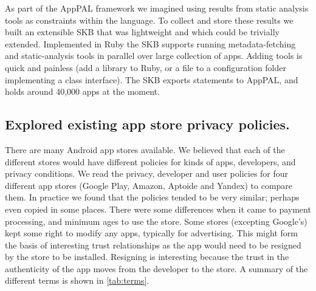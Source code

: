 \documentclass[a4paper]{scrartcl}
\begin{document}
As part of the AppPAL framework we imagined using results from static analysis tools as constraints within the language.
To collect and store these results we built an extensible \ac{SKB} that was lightweight and which could be trivially extended.
Implemented in Ruby the \ac{SKB} supports running metadata-fetching and static-analysis tools in parallel over large collection of apps.
Adding tools is quick and painless (add a library to Ruby, or a file to a configuration folder implementing a class interface).
The \ac{SKB} exports statements to AppPAL, and holds around 40,000 apps at the moment.

\subsection{Explored existing app store privacy policies.}

There are many Android app stores available.
We believed that each of the different stores would have different policies for kinds of apps, developers, and privacy conditions.
We read the privacy, developer and user policies for four different app stores (Google Play, Amazon, Aptoide and Yandex) to compare them.
In practice we found that the policies tended to be very similar; perhaps even copied in some places.
There were some differences when it came to payment processing, and minimum ages to use the store.
Some stores (excepting Google's) kept some right to modify any apps, typically for advertising.
This might form the basis of interesting trust relationships as the app would need to be resigned by the store to be installed.
Resigning is interesting because the trust in the authenticity of the app moves from the developer to the store.
A summary of the different terms is shown in \autoref{tab:terms}.
\end{document}
